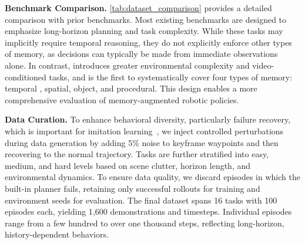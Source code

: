 {\relax
\noindent\textbf{Benchmark Comparison.}
\cref{tab:dataset_comparison} provides a detailed comparison with prior benchmarks. Most existing benchmarks \cite{han2025robocerebra, zhang2025vlabench, mees2022calvin} are designed to emphasize long-horizon planning and task complexity. While these tasks may implicitly require temporal reasoning, they do not explicitly enforce other types of memory, as decisions can typically be made from immediate observations alone.
In contrast, \benchname\xspace introduces greater environmental complexity and video-conditioned tasks, and is the first to systematically cover four types of memory: temporal%
, spatial, object, and procedural. This design enables a more comprehensive evaluation of memory-augmented robotic policies.
\par}



\noindent\textbf{Data Curation.}
To enhance behavioral diversity, particularly failure recovery, which is important for imitation learning~\cite{dai2025racer}, we inject controlled perturbations during data generation by adding 5\% noise to keyframe waypoints and then recovering to the normal  trajectory. Tasks are further stratified into easy, medium, and hard levels based on scene clutter, horizon length, and environmental dynamics. To ensure data quality, we discard episodes in which the built-in planner fails, retaining only successful rollouts for training and environment seeds for evaluation. The final dataset spans 16 tasks with 100 episodes each, yielding 1,600 demonstrations and \trainsteps\xspace  timesteps. Individual episodes range from a few hundred to over one thousand steps, reflecting long-horizon, history-dependent behaviors.

